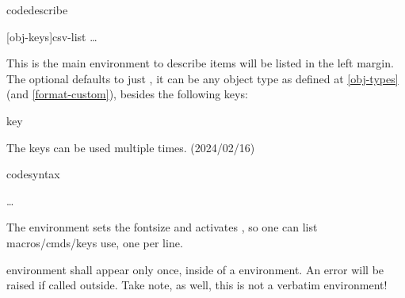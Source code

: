 \documentclass{article}
\begin{document}
\begin{codedescribe}[env,new=2023/05/01,update=2023/05/01,note={a note example},update=2024/02/16]{codedescribe}
\begin{codesyntax}
\tsmacro{\begin{codedescribe}}[obj-keys]{csv-list}
\ldots
\tsmacro{\end{codedescribe}}{}
\end{codesyntax}
This is the main environment to describe   items will be listed  in the left margin. The optional  defaults to just , it can be any object type as defined at \ref{obj-types} (and \ref{format-custom}), besides the following keys:
\begin{describelist*}{key}
\end{describelist*}
\end{codedescribe}
\begin{tsremark}
The keys  can be used multiple times. (2024/02/16)
\end{tsremark}
\begin{codedescribe}[env]{codesyntax}
\begin{codesyntax}
\tsmacro{\begin{codesyntax}}{}
\ldots
\tsmacro{\end{codesyntax}}{}
\end{codesyntax}
The  environment sets the fontsize and activates \tsmacro{\obeylines,\obeyspaces}{}, so one can list macros/cmds/keys use, one per line.
\end{codedescribe}

\begin{tsremark}
 environment shall appear only once, inside of a  environment. An error will be raised if called outside. Take note, as well, this is not a verbatim environment!
\end{tsremark}
\end{document}
